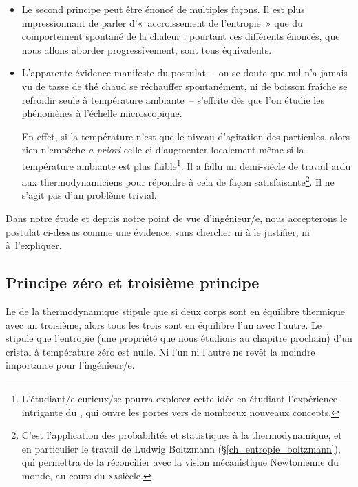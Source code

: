 		\begin{itemize}
			\item Le second principe peut être énoncé de multiples façons. Il est plus impressionnant de parler d’«~accroissement de l’entropie~» que du comportement spontané de la chaleur ; pourtant ces différents énoncés, que nous allons aborder progressivement, sont tous équivalents.
			\item L’apparente évidence manifeste du postulat --\ on se doute que nul n’a jamais vu de tasse de thé chaud se réchauffer spontanément, ni de boisson fraîche se refroidir seule à température ambiante\ -- s’effrite dès que l’on étudie les phénomènes à l’échelle microscopique.

		En effet, si la température n’est que le niveau d’agitation des particules, alors rien n’empêche \textit{a priori} celle-ci d’augmenter localement même si la température ambiante est plus faible\footnote{L’étudiant/e curieux/se pourra explorer cette idée en étudiant l’expérience intrigante du \textit{}, qui ouvre les portes vers de nombreux nouveaux concepts.}. Il a fallu un demi-siècle de travail ardu aux thermodynamiciens pour répondre à cela de façon satisfaisante\footnote{C’est l’application des probabilités et statistiques à la thermodynamique, et en particulier le travail de Ludwig Boltzmann (\S\ref{ch_entropie_boltzmann}), qui permettra de la réconcilier avec la vision mécanistique Newtonienne du monde, au cours du \textsc{xx}\ieme siècle.}. Il ne s’agit pas d’un problème trivial.
		\end{itemize}

		Dans notre étude et depuis notre point de vue d’ingénieur/e, nous accepterons le postulat ci-dessus comme une évidence, sans chercher ni à le justifier, ni à~l’\mbox{expliquer}.
		
		
	\subsection{Principe zéro et troisième principe}
	
		Le  de la thermodynamique stipule que si deux corps sont en équilibre thermique avec un troisième, alors tous les trois sont en équilibre l’un avec l’autre. Le  stipule que l’entropie (une propriété que nous étudions au chapitre prochain) d’un cristal à température zéro est nulle. Ni l’un ni l’autre ne revêt la moindre importance pour l’ingénieur/e.



